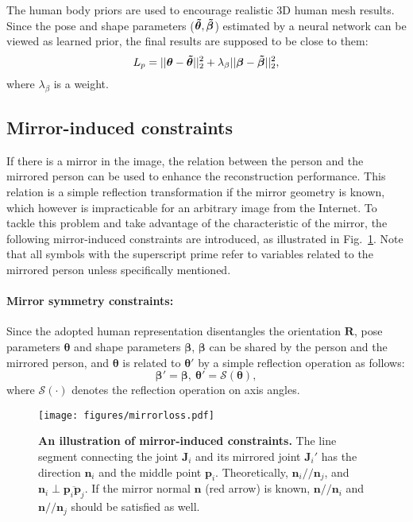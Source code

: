 The human body priors are used to encourage realistic 3D human mesh results. Since the pose and shape parameters ($ \bm{\Tilde{\theta}}, \bm{\Tilde{\beta}}$) estimated by a neural network can be viewed as learned prior, the final results are supposed to be close to them:
\begin{equation}
    L_{p} = ||\bm{\theta} - \bm{\Tilde{\theta}}||_2^2  + \lambda_{\beta}|| \bm{\beta} - \bm{\Tilde{\beta}}||_2^2,
\end{equation}
where $\lambda_{\beta}$ is a weight.

\subsection{Mirror-induced constraints}
\label{sec:mi_geo}
If there is a mirror in the image, the relation between the person and the mirrored person can be used to enhance the reconstruction performance. This relation is a simple reflection transformation if the mirror geometry is known, which however is impracticable for an arbitrary image from the Internet. To tackle this problem and take advantage of the characteristic of the mirror, the following mirror-induced constraints are introduced, as illustrated in Fig.~\ref{fig:mirrorsym}. Note that all symbols with the superscript prime refer to variables related to the mirrored person unless specifically mentioned.

\paragraph{Mirror symmetry constraints:}
Since the adopted human representation disentangles the orientation $\bm R$, pose parameters $\bm \theta$ and shape parameters $\bm \beta$, $\bm \beta$ can be shared by the person and the mirrored person, and $\bm \theta$ is related to $\bm \theta'$ by a simple reflection operation as follows:
\begin{equation}
\label{eq:param}
    \bm{\beta}' = \bm{\beta}, ~\bm{\theta}' = \mathcal{S}(\bm \theta),
\end{equation}
where $\mathcal{S}(\cdot)$ denotes the reflection operation on axis angles. 
\begin{figure}[t]
\centering
\texttt{[image: figures/mirrorloss.pdf]}
\caption{\textbf{An illustration of mirror-induced constraints.} The line segment connecting the joint $\bm{J}_i$ and its mirrored joint $\bm{J}_i'$ has the direction $\bm n_i$ and the middle point $\bm p_i$. Theoretically, $\bm{n}_i // \bm{n}_j$, and $\bm{n}_i \perp \overline{\bm{p}_i\bm{p}_j}$. If the mirror normal $\bm{n}$ (red arrow) is known, $\bm{n} // \bm{n}_i$ and $\bm{n} // \bm{n}_j$ should be satisfied as well.}
\label{fig:mirrorsym}
\end{figure}

